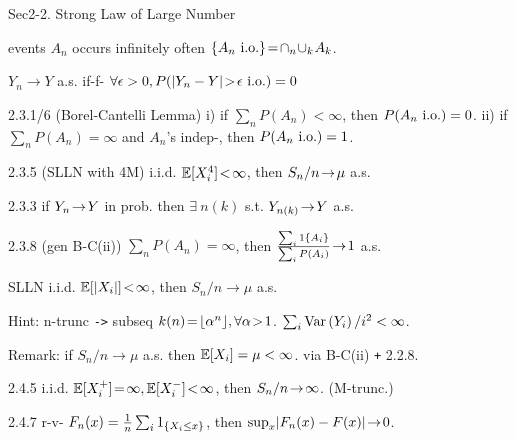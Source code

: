 Sec2-2. Strong Law of Large Number \hrulefill

\begin{defi}
    events $A_n$ occurs infinitely often
    $\{A_n \text{ i.o.} \} \!=\! \cap_n \! \cup_k \! A_k$.
\end{defi}

\begin{fact}
    $Y_n \rightarrow Y$ a.s. if-f- $\forall \epsilon > 0, P(\lvert Y_n - Y \rvert \!>\! \epsilon \text{ i.o.}) = 0$ 
\end{fact}

\begin{thm}{2.3.1/6} (Borel-Cantelli Lemma) 
    \newline 
    i) if $\sum_n P(A_n) < \infty$, then $P(A_n \text{ i.o.}) = 0$.
    \newline
    ii) if $\sum_n P(A_n) = \infty$ and $A_n$'s indep-, then $P ( A_n \text{ i.o.} ) = 1$.
\end{thm}

\begin{thm}{2.3.5} (SLLN with 4M)
    i.i.d. $\mathbb{E}[X_i^4] \!<\! \infty$, then $S_n/n \!\rightarrow\! \mu$ a.s.
\end{thm}

\begin{thm}{2.3.3}
    if $Y_n \!\rightarrow\! Y$ in prob. then $\exists\ n(k)$ s.t. $Y_{n(k)} \!\rightarrow\! Y$ a.s.
\end{thm}

\begin{thm}{2.3.8} (gen B-C(ii)) 
    $\sum_{n} P(A_n) = \infty$, then $\frac{ \sum_i 1\{A_i\} }{ \sum_i P(A_i) } \!\rightarrow\! 1$ a.s.
\end{thm}


\begin{thm}{SLLN}
    i.i.d. $\mathbb{E}[\lvert X_i \rvert] \!<\! \infty$, then $S_n/n \rightarrow \mu$ a.s.
    
    Hint: n-trunc \verb|->| subseq $k(n) \!=\! \lfloor \alpha^n \rfloor, \forall \alpha \!>\! 1$. $\sum_i \text{Var}\left( Y_i \right)/i^2 < \infty$.
    
    Remark: if $S_n/n \rightarrow \mu$ a.s. then $\mathbb{E}[X_i] = \mu < \infty$. via B-C(ii) \verb|+| 2.2.8.
\end{thm}

\begin{thm}{2.4.5}
    i.i.d. $\mathbb{E}[X_i^+] \!=\! \infty, \mathbb{E}[X_i^-] \!<\! \infty$, then $S_n/n \!\rightarrow\! \infty$. (M-trunc.)
\end{thm}

\begin{thm}{2.4.7}
    r-v- $F_n(x) = \frac{1}{n}\sum_i 1_{\{X_i \leq x\}}$, then $\sup_x \lvert F_n(x) - F(x) \rvert \!\rightarrow\! 0$.
\end{thm}



